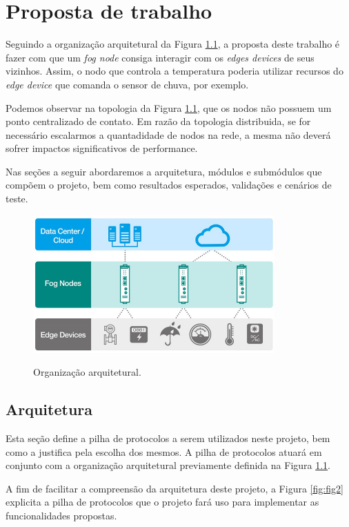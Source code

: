 \chapter{\label{chap:chap3} Proposta de trabalho}

Seguindo a organização arquitetural da Figura \ref{fig:fig1}, a proposta deste trabalho é fazer com que um \textit{fog node} consiga interagir com os \textit{edges devices} de seus vizinhos.
Assim, o nodo que controla a temperatura poderia utilizar recursos do \textit{edge device} que comanda o sensor de chuva, por exemplo.

Podemos observar na topologia da Figura \ref{fig:fig1}, que os nodos não possuem um ponto centralizado de contato.
Em razão da topologia distribuida, se for necessário escalarmos a quantadidade de nodos na rede, a mesma não deverá sofrer impactos significativos de performance.

Nas seções a seguir abordaremos a arquitetura, módulos e submódulos que compõem o projeto, bem como resultados esperados, validações e cenários de teste. 

\begin{figure}[htb!]
    \centering\includegraphics[width=.75\textwidth]{fig1.pdf}
    \caption
    {\label{fig:fig1} Organização arquitetural.} \cite{archfog:2017}
\end{figure}

\section{Arquitetura}

Esta seção define a pilha de protocolos a serem utilizados neste projeto, bem como a justifica pela escolha dos mesmos.
A pilha de protocolos atuará em conjunto com a organização arquitetural previamente definida na Figura \ref{fig:fig1}.

A fim de facilitar a compreensão da arquitetura deste projeto, a Figura \ref{fig:fig2} explicita a pilha de protocolos que o projeto fará uso para implementar as funcionalidades propostas.


